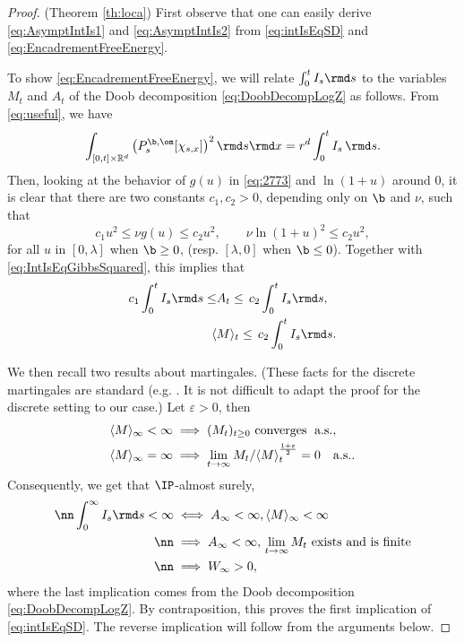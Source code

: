 \begin{proof} (Theorem \ref{th:loca})
First observe that one can easily derive \eqref{eq:AsymptIntIs1} and \eqref{eq:AsymptIntIs2} from \eqref{eq:intIsEqSD} and \eqref{eq:EncadrementFreeEnergy}.

To show \eqref{eq:EncadrementFreeEnergy}, we will relate $\int_0^t I_s\rmd s$ to the variables $M_t$ and $A_t$ of the Doob decomposition \eqref{eq:DoobDecompLogZ} as follows. From %
\eqref{eq:useful}, we have
\begin{equation} \label{eq:IntIsEqGibbsSquared} \int_{[0,t]\times\mathbb{R}^d} \left(P_s^{\b,\om}[\chi_{s,x}]\right)^2 \rmd s \rmd x = 
 r^d \int_0^t I_s \, \rmd s .
\end{equation}
Then, looking at the behavior of $g(u)$ in \eqref{eq:2773} 
and $\ln(1+u)$ around $0$, it is clear that there are two constants $c_1,c_2>0$, depending only on $\b$ and $\nu$, such that
\[ c_1 u^2 \leq \nu g(u) \leq c_2 u^2, \quad \quad \nu\ln(1+u)^2 \leq c_2 u^2,\]
for all $u$ in $[0,\lambda]$ when $\b\geq 0$, (resp. $[\lambda,0]$ when $\b\leq 0$). Together with \eqref{eq:IntIsEqGibbsSquared}, this implies that %
\begin{align}\label{eq:encadrementAtIs}
c_1 \int_0^t I_s \rmd s \leq & A_t \leq  \, c_2 \int_0^t I_s \rmd s,\\
\langle & M \rangle_t \leq  \, c_2 \int_0^t I_s \rmd s.\label{eq:majCrochetMtIs}
\end{align}

We then recall two results about martingales. (These facts for the discrete martingales are standard (e.g. \cite[p. 255, (4.9),(4.10)]{Dur95}. It
is not difficult to adapt the proof for the discrete setting to our case.)
Let $\varepsilon >0$, then
\begin{align} &\langle M \rangle_\infty < \infty \implies (M_t)_{t\geq 0} \text{ converges\; a.s.}, \label{eq:BracketImpliesCV}\\  
&\langle M \rangle_\infty = \infty \implies \lim_{t\to\infty} M_t / \langle M \rangle_t^{\frac{1+\varepsilon}{2}} = 0 \quad {\rm a.s.}. \label{eq:InfiniteBracket}
\end{align}
Consequently, we get that $\IP$-almost surely,
\begin{align} \nn
\int_0^\infty I_s \rmd s < \infty & \iff A_\infty < \infty,  \langle M \rangle_\infty < \infty\\ \nn
& \implies  A_\infty < \infty, \, \lim_{t\to\infty} M_t \text{ exists and is finite}\\ \nn
& \implies W_\infty > 0,
\end{align}
where the last implication comes from the Doob decomposition \eqref{eq:DoobDecompLogZ}. By contraposition, this proves the first implication of \eqref{eq:intIsEqSD}.
The reverse implication will follow from the arguments below.


\end{proof}
